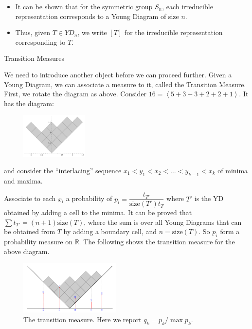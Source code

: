\documentclass[aspectratio=169]{beamer}
\newcommand{\act}[1]{%
    \begin{frame}
    \centering
    \Huge

    {\color{purple} #1}
    \end{frame}
}
\newcommand{\perm}[1]{\left\langle#1\right\rangle}
\newcommand{\R}{\mathbb{R}}
\newcommand{\size}{\mathrm{size}}
\begin{document}
\begin{frame}
    \begin{itemize}
        \item<1-> It can be shown that for the symmetric group $S_n$, each irreducible representation corresponds to a Young Diagram of size $n$.
        \item<2-> Thus, given $T \in YD_n$, we write $[T]$ for the irreducible representation corresponding to $T$.
    \end{itemize}
\end{frame}

\act{Transition Measures}


\begin{frame}
    We need to introduce another object before we can proceed further. \pause Given a Young Diagram, we can associate a measure to it, called the Transition Measure. \pause First, we rotate the diagram as above. Consider $16 = \perm{5 + 3 + 3 + 2 + 2 + 1}$. It has the diagram:\pause
    \begin{figure}
        \centering
        \includegraphics[width = 0.3\textwidth]{trans1}
    \end{figure}\pause
    and consider the ``interlacing'' sequence $x_1 < y_1 < x_2 < \ldots < y_{k - 1} < x_k$ of minima and maxima.
\end{frame}

\begin{frame}
    Associate to each $x_i$ a probability of $p_i = \dfrac{t_{T'}}{\size(T')t_T}$ where $T'$ is the YD obtained by adding a cell to the minima. \pause It can be proved that $\sum{t_{T'}} = (n + 1)\size(T)$, where the sum is over all Young Diagrams that can be obtained from $T$ by adding a boundary cell, and $n = \size(T)$. \pause So $p_i$ form a probability measure on $\R$. The following shows the transition measure for the above diagram. \pause
    \begin{figure}
        \includegraphics[width = 0.45\textwidth]{trans2}
        \caption{The transition measure. Here we report $q_k = p_k / \max p_k$.}
    \end{figure}
\end{frame}
\end{document}
